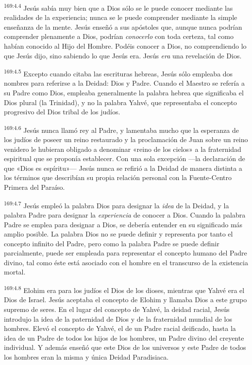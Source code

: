 \par 
\textsuperscript{169:4.4} Jesús sabía muy bien que a Dios sólo se le puede conocer mediante las realidades de la experiencia; nunca se le puede comprender mediante la simple enseñanza de la mente. Jesús enseñó a sus apóstoles que, aunque nunca podrían comprender plenamente a Dios, podrían \textit{conocerlo} con toda certeza, tal como habían conocido al Hijo del Hombre. Podéis conocer a Dios, no comprendiendo lo que Jesús dijo, sino sabiendo lo que Jesús era. Jesús \textit{era} una revelación de Dios.

\par 
\textsuperscript{169:4.5} Excepto cuando citaba las escrituras hebreas, Jesús sólo empleaba dos nombres para referirse a la Deidad: Dios y Padre. Cuando el Maestro se refería a su Padre como Dios, empleaba generalmente la palabra hebrea que significaba el Dios plural (la Trinidad), y no la palabra Yahvé, que representaba el concepto progresivo del Dios tribal de los judíos.

\par 
\textsuperscript{169:4.6} Jesús nunca llamó rey al Padre, y lamentaba mucho que la esperanza de los judíos de poseer un reino restaurado y la proclamación de Juan sobre un reino venidero le hubieran obligado a denominar «reino de los cielos» a la fraternidad espiritual que se proponía establecer. Con una sola excepción ---la declaración de que «Dios es espíritu»--- Jesús nunca se refirió a la Deidad de manera distinta a los términos que describían su propia relación personal con la Fuente-Centro Primera del Paraíso.

\par 
\textsuperscript{169:4.7} Jesús empleó la palabra Dios para designar la \textit{idea} de la Deidad, y la palabra Padre para designar la \textit{experiencia} de conocer a Dios. Cuando la palabra Padre se emplea para designar a Dios, se debería entender en su significado más amplio posible. La palabra Dios no se puede definir y representa por tanto el concepto infinito del Padre, pero como la palabra Padre se puede definir parcialmente, puede ser empleada para representar el concepto humano del Padre divino, tal como éste está asociado con el hombre en el transcurso de la existencia mortal.

\par 
\textsuperscript{169:4.8} Elohim era para los judíos el Dios de los dioses, mientras que Yahvé era el Dios de Israel. Jesús aceptaba el concepto de Elohim y llamaba Dios a este grupo supremo de seres. En el lugar del concepto de Yahvé, la deidad racial, Jesús introdujo la idea de la paternidad de Dios y de la fraternidad mundial de los hombres. Elevó el concepto de Yahvé, el de un Padre racial deificado, hasta la idea de un Padre de todos los hijos de los hombres, un Padre divino del creyente individual. Y además enseñó que este Dios de los universos y este Padre de todos los hombres eran la misma y única Deidad Paradisiaca.

